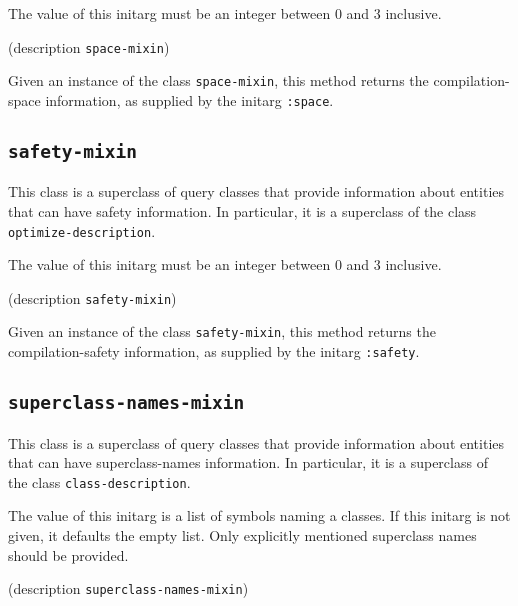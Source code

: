 {\footnotesize
{}
}

The value of this initarg must be an integer between $0$ and $3$
inclusive.

{\footnotesize
{} {(description {\tt space-mixin})}
}

Given an instance of the class \texttt{space-mixin}, this method
returns the compilation-space information, as supplied by the initarg
\texttt{:space}.

\subsection{\texttt{safety-mixin}}
\label{sec-safety-mixin}

{\footnotesize
{}
}

This class is a superclass of query classes that provide information
about entities that can have safety information.  In particular, it is a
superclass of the class \texttt{optimize-description}.

{\footnotesize
{}
}

The value of this initarg must be an integer between $0$ and $3$
inclusive.

{\footnotesize
{} {(description {\tt safety-mixin})}
}

Given an instance of the class \texttt{safety-mixin}, this method
returns the compilation-safety information, as supplied by the initarg
\texttt{:safety}.

\subsection{\texttt{superclass-names-mixin}}
\label{sec-superclass-names-mixin}

{\footnotesize
{}
}

This class is a superclass of query classes that provide information
about entities that can have superclass-names information.  In
particular, it is a superclass of the class \texttt{class-description}.

{\footnotesize
{}
}

The value of this initarg is a list of symbols naming a classes.  If
this initarg is not given, it defaults the empty list.  Only
explicitly mentioned superclass names should be provided.

{\footnotesize
{} {(description {\tt superclass-names-mixin})}
}

